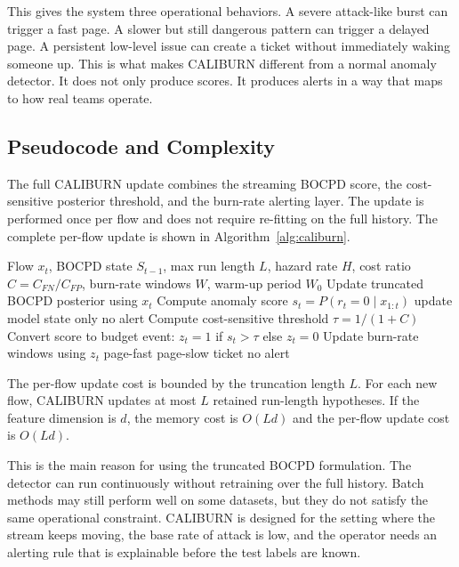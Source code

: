 \documentclass[preprint,12pt,authoryear]{elsarticle}
\newcommand{\caliburn}{CALIBURN}
\begin{document}
This gives the system three operational behaviors. A severe attack-like burst can trigger a fast page. A slower but still dangerous pattern can trigger a delayed page. A persistent low-level issue can create a ticket without immediately waking someone up. This is what makes \caliburn{} different from a normal anomaly detector. It does not only produce scores. It produces alerts in a way that maps to how real teams operate.

\subsection{Pseudocode and Complexity}
\label{sec:method-complexity}

The full \caliburn{} update combines the streaming BOCPD score, the cost-sensitive posterior threshold, and the burn-rate alerting layer. The update is performed once per flow and does not require re-fitting on the full history. The complete per-flow update is shown in Algorithm~\ref{alg:caliburn}.

\begin{algorithm}
\caption{\caliburn{} per-flow update}
\label{alg:caliburn}
\begin{algorithmic}[1]
\Require Flow $x_t$, BOCPD state $S_{t-1}$, max run length $L$, hazard rate $H$, cost ratio $C = C_{FN}/C_{FP}$, burn-rate windows $W$, warm-up period $W_0$
\State Update truncated BOCPD posterior using $x_t$
\State Compute anomaly score $s_t = P(r_t = 0 \mid x_{1:t})$
    \State update model state only
    \State \Return no alert
\EndIf
\State Compute cost-sensitive threshold $\tau = 1/(1 + C)$
\State Convert score to budget event: $z_t = 1$ if $s_t > \tau$ else $z_t = 0$
\State Update burn-rate windows using $z_t$
    \State \Return page-fast
    \State \Return page-slow
    \State \Return ticket
\Else
    \State \Return no alert
\EndIf
\end{algorithmic}
\end{algorithm}

The per-flow update cost is bounded by the truncation length $L$. For each new flow, \caliburn{} updates at most $L$ retained run-length hypotheses. If the feature dimension is $d$, the memory cost is $O(Ld)$ and the per-flow update cost is $O(Ld)$.

This is the main reason for using the truncated BOCPD formulation. The detector can run continuously without retraining over the full history. Batch methods may still perform well on some datasets, but they do not satisfy the same operational constraint. \caliburn{} is designed for the setting where the stream keeps moving, the base rate of attack is low, and the operator needs an alerting rule that is explainable before the test labels are known.
\end{document}
